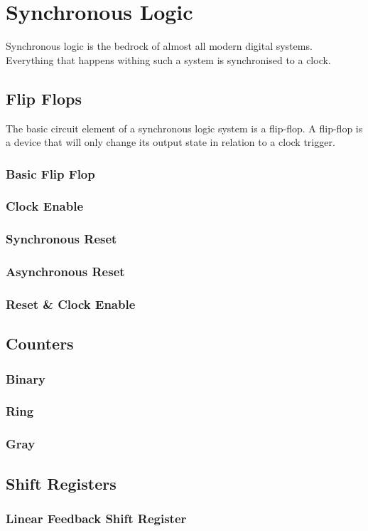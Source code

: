 
\chapter{Synchronous Logic}

Synchronous logic is the bedrock of almost all modern digital systems.
Everything that happens withing such a system is synchronised to a clock.

\section{Flip Flops}

The basic circuit element of a synchronous logic system is a flip-flop.
A flip-flop is a device that will only change its output state in relation to a clock trigger.

\subsection{Basic Flip Flop}


\subsection{Clock Enable}
\subsection{Synchronous Reset}
\subsection{Asynchronous Reset}
\subsection{Reset \& Clock Enable}

\section{Counters}
\subsection{Binary}
\subsection{Ring}
\subsection{Gray}
\section{Shift Registers}
\subsection{Linear Feedback Shift Register}
